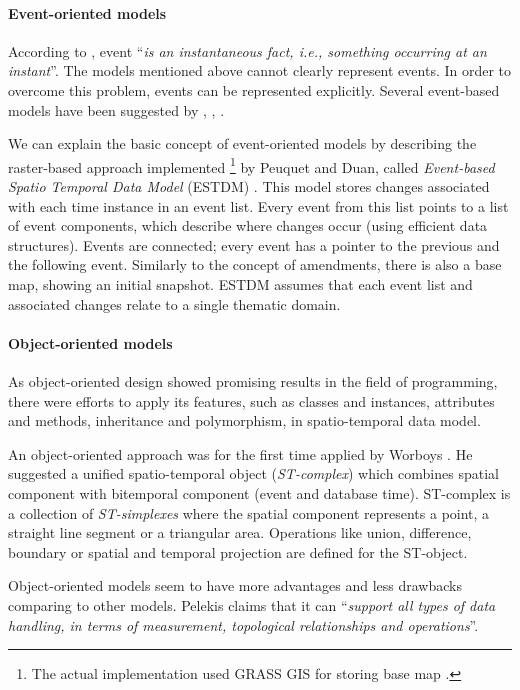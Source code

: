 \documentclass[a4paper,12pt]{book}
\begin{document}
\paragraph*{Event-oriented models}
According to \cite{temporalGlossary}, event ``\emph{is an instantaneous fact, i.e., something occurring at an instant}''.
The models mentioned above cannot clearly represent events.
In order to overcome this problem, events can be represented explicitly.
Several event-based models have been suggested by \cite{claramunt1995managing}, \cite{peuquet1995}, \cite{chen1998event}.

We can explain the basic concept of event-oriented models by describing
the raster-based approach implemented%
\footnote{The actual implementation used GRASS GIS for storing base map \cite{peuquet1995}.}
by Peuquet and Duan, called
\emph{Event-based Spatio Temporal Data Model} (ESTDM)  \cite{peuquet1995}.
This model stores changes associated with each time instance in an event list.
Every event from this list points to a list of event components,
which describe where changes occur (using efficient data structures).
Events are connected; every event has a pointer to the previous and the following event.
Similarly to the concept of amendments, there is also a base map, showing an initial snapshot.
ESTDM assumes that each event list and associated changes relate to a single thematic domain.

\paragraph*{Object-oriented models}
As object-oriented design showed promising results in the field of programming,
there were efforts to apply its features, such as classes and instances, attributes and methods,
inheritance and polymorphism, in spatio-temporal data model.

An object-oriented approach was for the first time applied by Worboys \cite{worboys1994unified}.
He suggested a unified spatio-temporal object (\emph{ST-complex}) which combines spatial component
with bitemporal component (event and database time). ST-complex is a collection of \emph{ST-simplexes}
where the spatial component represents a point, a straight line segment or a triangular area.
Operations like union, difference, boundary or spatial and temporal projection are defined for the ST-object.

Object-oriented models seem to have more advantages and less drawbacks comparing to other models.
Pelekis \cite{pelekis2004} claims that it can ``\emph{support  all types of data handling,
in terms of measurement, topological relationships and operations}''.
\end{document}
